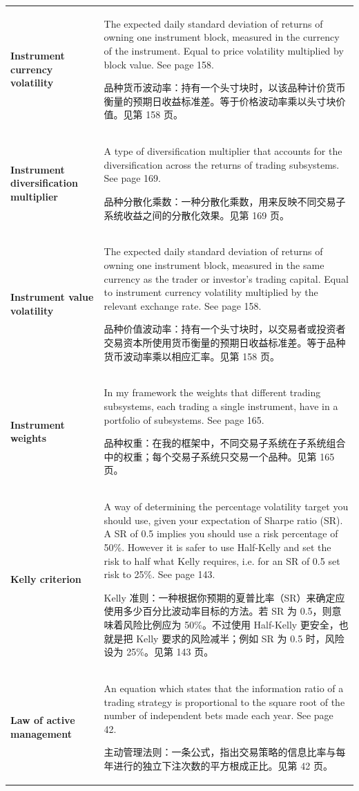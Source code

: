 \begin{chinesetableblock}
{\begin{longtable}{@{}>{\raggedright\arraybackslash\bfseries} p{}>{\raggedright\arraybackslash} p{}@{}}
Instrument currency volatility & The expected daily standard deviation of returns of owning one instrument block, measured in the currency of the instrument. Equal to price volatility multiplied by block value. See page 158. \par 品种货币波动率：持有一个头寸块时，以该品种计价货币衡量的预期日收益标准差。等于价格波动率乘以头寸块价值。见第 158 页。 \\[0.65em]
Instrument diversification multiplier & A type of diversification multiplier that accounts for the diversification across the returns of trading subsystems. See page 169. \par 品种分散化乘数：一种分散化乘数，用来反映不同交易子系统收益之间的分散化效果。见第 169 页。 \\[0.65em]
Instrument value volatility & The expected daily standard deviation of returns of owning one instrument block, measured in the same currency as the trader or investor’s trading capital. Equal to instrument currency volatility multiplied by the relevant exchange rate. See page 158. \par 品种价值波动率：持有一个头寸块时，以交易者或投资者交易资本所使用货币衡量的预期日收益标准差。等于品种货币波动率乘以相应汇率。见第 158 页。 \\[0.65em]
Instrument weights & In my framework the weights that different trading subsystems, each trading a single instrument, have in a portfolio of subsystems. See page 165. \par 品种权重：在我的框架中，不同交易子系统在子系统组合中的权重；每个交易子系统只交易一个品种。见第 165 页。 \\[0.65em]
Kelly criterion & A way of determining the percentage volatility target you should use, given your expectation of Sharpe ratio (SR). A SR of 0.5 implies you should use a risk percentage of 50\%. However it is safer to use Half-Kelly and set the risk to half what Kelly requires, i.e. for an SR of 0.5 set risk to 25\%. See page 143. \par Kelly 准则：一种根据你预期的夏普比率（SR）来确定应使用多少百分比波动率目标的方法。若 SR 为 0.5，则意味着风险比例应为 50\%。不过使用 Half-Kelly 更安全，也就是把 Kelly 要求的风险减半；例如 SR 为 0.5 时，风险设为 25\%。见第 143 页。 \\[0.65em]
Law of active management & An equation which states that the information ratio of a trading strategy is proportional to the square root of the number of independent bets made each year. See page 42. \par 主动管理法则：一条公式，指出交易策略的信息比率与每年进行的独立下注次数的平方根成正比。见第 42 页。 \\[0.65em]

\end{longtable}}
\end{chinesetableblock}
